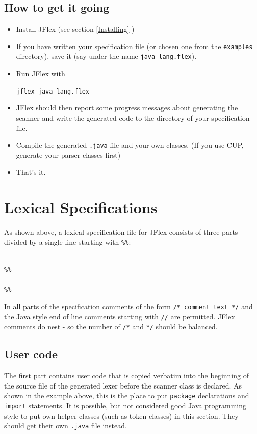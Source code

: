 \documentclass[11pt]{scrartcl}
\begin{document}
\subsection{How to get it going}
\begin{itemize}
\item
Install JFlex (see section \ref{Installing} )

\item
If you have written your specification file (or chosen one from the \texttt{examples}
directory), save it (say under the name \texttt{java-lang.flex}).

\item
Run JFlex with

\texttt{jflex java-lang.flex}

\item
JFlex should then report some progress messages about generating the scanner
and write the generated code to the directory of your specification file.

\item
Compile the generated \texttt{.java} file and your own classes. (If you
use CUP, generate your parser classes first)

\item
That's it.
\end{itemize}


\section{Lexical Specifications}\label{Specifications}
As shown above, a lexical specification file for JFlex consists of three
parts divided by a single line starting with \texttt{\%\%}:

\texttt{}\\
\texttt{\%\%}\\
\texttt{}\\
\texttt{\%\%}\\
\texttt{}

In all parts of the specification comments of the form
\texttt{/* comment text */} and the Java style end of line comments starting with \texttt{//}
are permitted. JFlex comments do nest - so the number of \texttt{/*} and \texttt{*/} 
should be balanced.

\subsection{User code}\label{SpecUsercode}
The first part contains user code that is copied verbatim into the beginning
of the source file of the generated lexer before the scanner class is declared. 
As shown in the example above, this is the place to put \texttt{package} 
declarations and \texttt{import}
statements. It is possible, but not considered good Java programming
style to put own helper classes (such as token classes) in this section.
They should get their own \texttt{.java} file instead.
\end{document}

